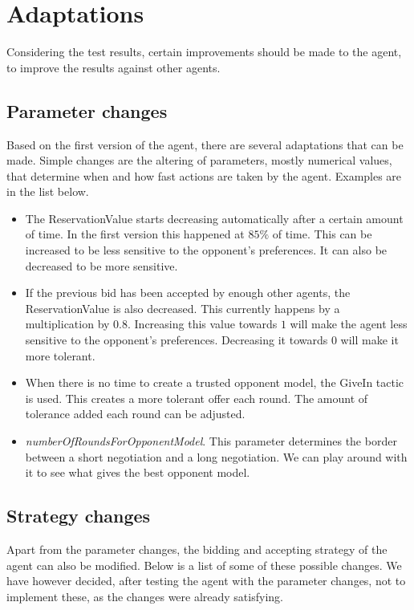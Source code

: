 \section{Adaptations}
\label{sec:adaptations}
Considering the test results, certain improvements should be made to the agent, to improve the results against other agents.

\subsection{Parameter changes}
Based on the first version of the agent, there are several adaptations that can be made. Simple changes are the altering of parameters, mostly numerical values, that determine when and how fast actions are taken by the agent. Examples are in the list below.

\begin{itemize}
\item The ReservationValue starts decreasing automatically after a certain amount of time. In the first version this happened at $85\%$ of time. This can be increased to be less sensitive to the opponent's preferences. It can also be decreased to be more sensitive.
\item If the previous bid has been accepted by enough other agents, the ReservationValue is also decreased. This currently happens by a multiplication by $0.8$. Increasing this value towards $1$ will make the agent less sensitive to the opponent's preferences. Decreasing it towards $0$ will make it more tolerant.
\item When there is no time to create a trusted opponent model, the GiveIn tactic is used. This creates a more tolerant offer each round. The amount of tolerance added each round can be adjusted.
\item \emph{numberOfRoundsForOpponentModel}. This parameter determines the border between a short negotiation and a long negotiation. We can play around with it to see what gives the best opponent model.
\end{itemize}


\subsection{Strategy changes}
Apart from the parameter changes, the bidding and accepting strategy of the agent can also be modified. Below is a list of some of these possible changes. We have however decided, after testing the agent with the parameter changes, not to implement these, as the changes were already satisfying.
 
